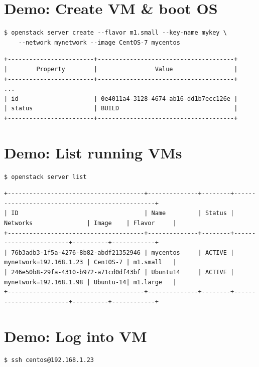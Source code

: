 \documentclass[11pt]{article}
\begin{document}
\section*{Demo: Create VM \& boot OS}
\label{sec:orgcd22f6e}
\begin{verbatim}
$ openstack server create --flavor m1.small --key-name mykey \
    --network mynetwork --image CentOS-7 mycentos
\end{verbatim}

\begin{verbatim}
+------------------------+--------------------------------------+
|        Property        |                Value                 |
+------------------------+--------------------------------------+
...
| id                     | 0e4011a4-3128-4674-ab16-dd1b7ecc126e |
| status                 | BUILD                                |
+------------------------+--------------------------------------+
\end{verbatim}

\section*{Demo: List running VMs}
\label{sec:org5d0b7f9}
\begin{verbatim}
$ openstack server list
\end{verbatim}

\begin{verbatim}
+--------------------------------------+--------------+--------+------------------------------------------------+
| ID                                   | Name         | Status | Networks               | Image    | Flavor     |
+--------------------------------------+--------------+--------+------------------------+----------+------------+
| 76b3adb3-1f5a-4276-8b82-abdf21352946 | mycentos     | ACTIVE | mynetwork=192.168.1.23 | CentOS-7 | m1.small   |
| 246e50b8-29fa-4310-b972-a71cd0df43bf | Ubuntu14     | ACTIVE | mynetwork=192.168.1.98 | Ubuntu-14| m1.large   |
+--------------------------------------+--------------+--------+------------------------+----------+------------+
\end{verbatim}

\section*{Demo: Log into VM}
\label{sec:org1742b3a}
\begin{verbatim}
$ ssh centos@192.168.1.23
\end{verbatim}
\end{document}
